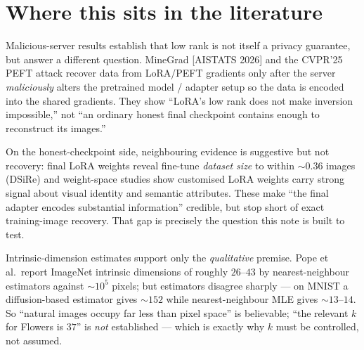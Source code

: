 \section{Where this sits in the literature}
Malicious-server results establish that low rank is not itself a privacy guarantee, but
answer a different question. MineGrad [AISTATS 2026] and the CVPR'25 PEFT attack recover
data from LoRA/PEFT gradients only after the server \emph{maliciously} alters the
pretrained model / adapter setup so the data is encoded into the shared gradients. They
show ``LoRA's low rank does not make inversion impossible,'' not ``an ordinary honest
final checkpoint contains enough to reconstruct its images.''

On the honest-checkpoint side, neighbouring evidence is suggestive but not recovery: final
LoRA weights reveal fine-tune \emph{dataset size} to within $\sim\!0.36$ images (DSiRe)
and weight-space studies show customised LoRA weights carry strong signal about visual
identity and semantic attributes. These make ``the final adapter encodes substantial
information'' credible, but stop short of exact training-image recovery. That gap is
precisely the question this note is built to test.

Intrinsic-dimension estimates support only the \emph{qualitative} premise. Pope et al.\
report ImageNet intrinsic dimensions of roughly $26$--$43$ by nearest-neighbour estimators
against $\sim\!10^5$ pixels; but estimators disagree sharply --- on MNIST a diffusion-based
estimator gives $\sim\!152$ while nearest-neighbour MLE gives $\sim\!13$--$14$.
So ``natural images occupy far less than pixel space'' is believable; ``the relevant $k$
for Flowers is $37$'' is \emph{not} established --- which is exactly why $k$ must be
controlled, not assumed.

